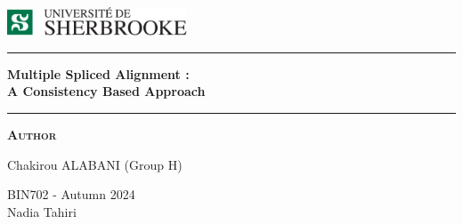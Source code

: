 
\begin{titlepage}
\begin{center}
\vspace{2cm}
\includegraphics[width=0.4\textwidth]{figures/udeslog.png}~\\[1cm]
\vspace{2cm}

\hrule
\vspace{.5cm}
{ \huge \bfseries Multiple Spliced Alignment : \\ A Consistency Based Approach} %
\vspace{.5cm}

\hrule
\vspace{1.5cm}

\textsc{\textbf{Author}}\\
\vspace{.5cm}
\centering

Chakirou ALABANI (Group H)\\


\vspace{8cm}

\centering BIN702 - Autumn 2024 \\ 
\centering Nadia Tahiri
\end{center}
\end{titlepage}